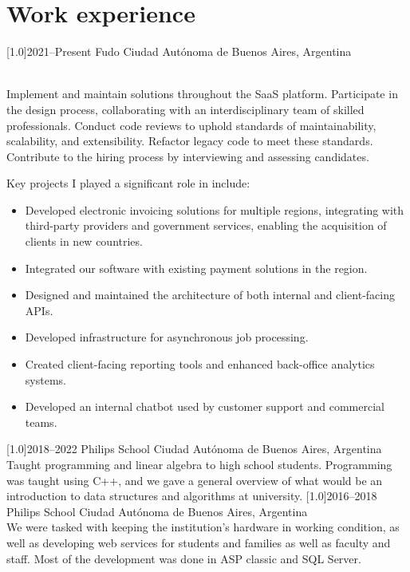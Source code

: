 \documentclass{cv-style}     %
\begin{document}
\section{Work experience}
  \vspace{-0.2cm}
\begin{entrylist}
\entry
  {\scalebox{.8}[1.0]{2021--Present}}
  {Fudo}
  {Ciudad Autónoma de Buenos Aires, Argentina}
  {\\
  Implement and maintain solutions throughout the SaaS platform. Participate in
  the design process, collaborating with an interdisciplinary team of skilled
  professionals. Conduct code reviews to uphold standards of maintainability,
  scalability, and extensibility. Refactor legacy code to meet these standards.
  Contribute to the hiring process by interviewing and assessing candidates.

  Key projects I played a significant role in include:
  \begin{itemize}
  \item Developed electronic invoicing solutions for multiple regions,
    integrating with third-party providers and government services, enabling
    the acquisition of clients in new countries.
  \item Integrated our software with existing payment solutions in the region.
  \item Designed and maintained the architecture of both internal and client-facing APIs.
  \item Developed infrastructure for asynchronous job processing.
  \item Created client-facing reporting tools and enhanced back-office analytics systems.
  \item Developed an internal chatbot used by customer support and commercial teams.
  \end{itemize}
  }
\entry
  {\scalebox{.8}[1.0]{2018--2022}}
  {Philips School}
  {Ciudad Autónoma de Buenos Aires, Argentina}
  {\\
  Taught programming and linear algebra to high school students. Programming was taught
  using C++, and we gave a general overview of what would be an introduction to data structures and
  algorithms at university.}
\vspace{-0.3cm}
\entry
  {\scalebox{.8}[1.0]{2016--2018}}
  {Philips School}
  {Ciudad Autónoma de Buenos Aires, Argentina}
  {\\
     We were tasked with keeping the institution's hardware in working condition, as
     well as developing web services for students and families as well as faculty and staff.
     Most of the development was done in ASP classic and SQL Server.}
\end{entrylist}
\end{document}
